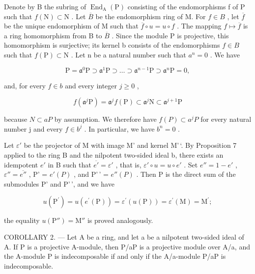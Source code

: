 Denote by B the subring of \(\operatorname{End}_{\mathrm{A}}(\mathrm{P})\) consisting of the endomorphisms f of P such that \(f(\mathrm{N}) \subset \mathrm{N}\) . Let \(\overline{B}\) be the endomorphism ring of M. For \(f \in B\) , let \(\overline{f}\) be the unique endomorphism of M such that \(\overline{f} \circ u = u \circ f\) . The mapping \(f \mapsto \overline{f}\) is a ring homomorphism from B to \(\overline{B}\) . Since the module P is projective, this homomorphism is surjective; its kernel b consists of the endomorphisms \(f \in B\) such that \(f(\mathrm{P}) \subset \mathrm{N}\) . Let n be a natural number such that \(a^{n} = 0\) . We have

\[
\mathrm{P} = \mathfrak {a} ^ {0} \mathrm{P} \supset \mathfrak {a} ^ {1} \mathrm{P} \supset \dots \supset \mathfrak {a} ^ {n - 1} \mathrm{P} \supset \mathfrak {a} ^ {n} \mathrm{P} = 0,
\]

and, for every \(f \in b\) and every integer \(j \geqslant 0\) ,

\[
f (\mathfrak {a} ^ {j} \mathrm{P}) = \mathfrak {a} ^ {j} f (\mathrm{P}) \subset \mathfrak {a} ^ {j} \mathrm{N} \subset \mathfrak {a} ^ {j + 1} \mathrm{P}
\]

because \(N \subset aP\) by assumption. We therefore have \(f(P) \subset a^{j}P\) for every natural number j and every \(f \in b^{j}\) . In particular, we have \(b^{n} = 0\) .

Let \(\varepsilon'\) be the projector of M with image M' and kernel M'\,`. By Proposition 7 applied to the ring B and the nilpotent two-sided ideal b, there exists an idempotent \(e'\) in B such that \(\overline{e'} = \varepsilon'\) , that is, \(\varepsilon' \circ u = u \circ e'\) . Set \(e'' = 1 - e'\) , \(\varepsilon'' = \overline{e''}\) , P' = \(e'(P)\) , and P'\,' = \(e''(P)\) . Then P is the direct sum of the submodules P' and P'\,', and we have

\[
u (\mathrm{P} ^ {\prime}) = u (e ^ {\prime} (\mathrm{P})) = \varepsilon^ {\prime} (u (\mathrm{P})) = \varepsilon^ {\prime} (\mathrm{M}) = \mathrm{M} ^ {\prime};
\]

the equality \(u(\mathrm{P}'') = \mathrm{M}''\) is proved analogously.

COROLLARY 2. --- Let A be a ring, and let a be a nilpotent two-sided ideal of A. If P is a projective A-module, then P/aP is a projective module over A/a, and the A-module P is indecomposable if and only if the A/a-module P/aP is indecomposable.

